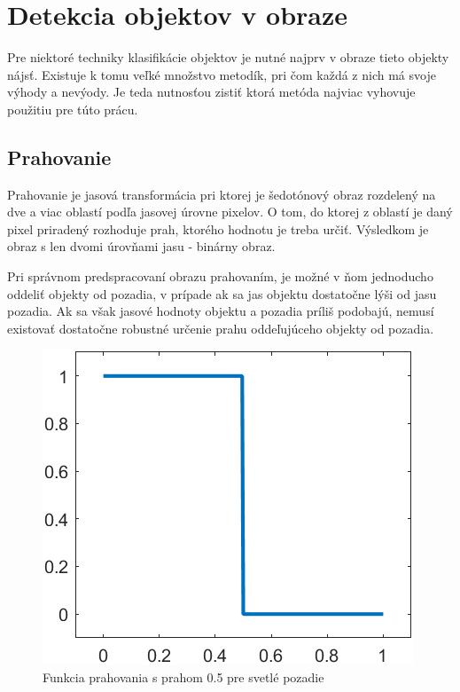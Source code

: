 \chapter{Detekcia objektov v obraze}

    Pre niektoré techniky klasifikácie objektov je nutné najprv v obraze tieto objekty nájsť. Existuje k tomu veľké množstvo metodík, pri čom každá z nich má svoje výhody a nevýody. Je teda nutnosťou zistiť ktorá metóda najviac vyhovuje použitiu pre túto prácu.

\section{Prahovanie}

    Prahovanie je jasová transformácia pri ktorej je šedotónový obraz rozdelený na dve a viac oblastí podľa jasovej úrovne pixelov. O tom, do ktorej z oblastí je daný pixel priradený rozhoduje prah, ktorého hodnotu je treba určiť. Výsledkom je obraz s len dvomi úrovňami jasu - binárny obraz.

    Pri správnom predspracovaní obrazu prahovaním, je možné v ňom jednoducho oddeliť objekty od pozadia, v prípade ak sa jas objektu dostatočne lýši od jasu pozadia. Ak sa však jasové hodnoty objektu a pozadia príliš podobajú, nemusí existovať dostatočne robustné určenie prahu oddeľujúceho objekty od pozadia.

    \begin{figure}[!ht]
        \begin{center}
            \includegraphics[scale=.4]{obrazky/threshold/thresholding.png}
        \end{center}
        \caption{Funkcia prahovania s prahom 0.5 pre svetlé pozadie}
    \end{figure}

